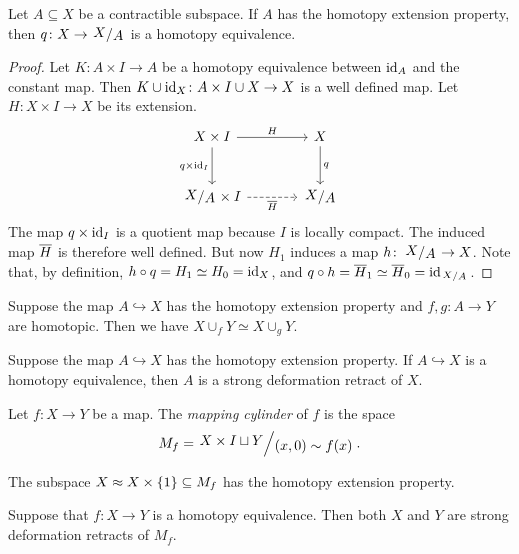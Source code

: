 \begin{trditev}
Let $A \subseteq X$ be a contractible subspace. If $A$ has the
homotopy extension property, then $q \colon X \to \kvoc{X}{A}$ is a
homotopy equivalence.
\end{trditev}

\begin{proof}
Let $K \colon A \times I \to A$ be a homotopy equivalence between
$\operatorname{id}_A$ and the constant map. Then
$K \cup \operatorname{id}_X \colon A \times I \cup X \to X$ is a well defined
map. Let $H \colon X \times I \to X$ be its extension.
\[
\begin{tikzcd}[column sep=large, row sep=large]
X \times I \arrow[r, "H"] \arrow[d, "q \times \id_I"'] &
X \arrow[d, "q"] \\
\kvoc{X}{A} \times I \arrow[r, dashed, "\oline{H}"']
&
\kvoc{X}{A}
\end{tikzcd}
\]
The map $q \times \operatorname{id}_I$ is a quotient map because $I$ is locally
compact. The induced map $\overline{H}$ is therefore well defined.
But now $H_1$ induces a map $h \colon \kvoc{X}{A} \to X$. Note
that, by definition, $h \circ q = H_1 \simeq H_0 = \operatorname{id}_X$, and
$q \circ h = \oline{H}_1 \simeq \oline{H}_0 = \id_{\kvoc{X}{A}}$.
\end{proof}


\begin{trditev}
Suppose the map $A \hookrightarrow X$ has the homotopy extension
property and $f, g \colon A \to Y$ are homotopic. Then we have
$X \cup_f Y \simeq X \cup_g Y$.
\end{trditev}

\begin{trditev}
Suppose the map $A \hookrightarrow X$ has the homotopy extension
property. If $A \hookrightarrow X$ is a homotopy equivalence, then
$A$ is a strong deformation retract of $X$.
\end{trditev}

\begin{definicija}
Let $f \colon X \to Y$ be a map. The
\emph{mapping cylinder} of $f$ is the space
\[
M_f = \kvoc{X \times I \sqcup Y}{(x,0) \sim f(x)}.
\]
\end{definicija}

\begin{opomba}
The subspace $X \approx X \times \left\{1\right\} \subseteq M_f$ has the
homotopy extension property.
\end{opomba}

\begin{trditev}
Suppose that $f \colon X \to Y$ is a homotopy equivalence. Then
both $X$ and $Y$ are strong deformation retracts of $M_f$.
\end{trditev}

